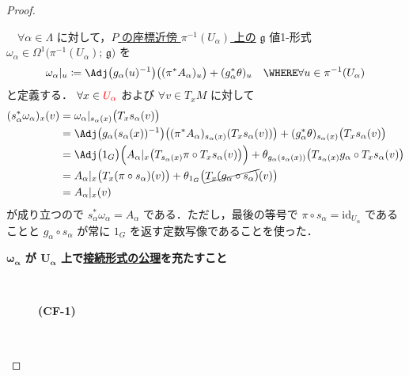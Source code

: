\documentclass[TQFT_main]{subfiles}
\begin{document}
\begin{proof}
\begin{enumerate}
        　$\forall \alpha \in \Lambda$ に対して，\underline{$P$ の座標近傍 $\pi^{-1}(U_\alpha)$ 上の} $\mathfrak{g}$ 値1-形式 $\omega_\alpha \in \Omega^1\bigl(\pi^{-1}(U_\alpha);\, \mathfrak{g}\bigr)$ を
        \begin{align}
            \label{def:patched-connection}
            \omega_\alpha|_u \coloneqq \Adj \bigl( g_\alpha(u)^{-1} \bigr)\bigl((\pi^* A_\alpha)_u\bigr) + (g_\alpha^*\theta)_u \quad \WHERE \forall u \in \pi^{-1}(U_\alpha)
        \end{align}
        と定義する．
        $\forall x \in \textcolor{red}{U_\alpha}$ および $\forall v \in T_{x} M$ に対して
        \begin{align}
            (s_\alpha^* \omega_\alpha)_{x}(v)
            &= \omega_\alpha|_{s_\alpha(x)} \bigl( T_{x} s_\alpha (v) \bigr) \\
            &= \Adj \bigl( g_\alpha(s_\alpha(x))^{-1} \bigr)\bigl((\pi^* A_\alpha)_{s_\alpha(x)}(T_x s_\alpha(v))\bigr) + (g_\alpha^*\theta)_{s_\alpha(x)}\bigl( T_{x} s_\alpha (v) \bigr) \\
            &= \Adj \bigl( 1_G \bigr)\Bigl(A_\alpha|_{x}\bigl(T_{s_\alpha(x)} \pi \circ T_x s_\alpha(v)\bigr)\Bigr) + \theta_{g_\alpha(s_\alpha(x))}\bigl( T_{s_\alpha(x)} g_\alpha \circ T_{x} s_\alpha (v) \bigr) \\
            &= A_\alpha|_{x}\bigl(T_x(\pi \circ s_\alpha)(v)\bigr) + \theta_{1_G}\bigl( \cancel{T_{x} (g_\alpha \circ s_\alpha)} (v) \bigr) \\
            &= A_\alpha|_{x}(v)
        \end{align}
        が成り立つので $s_\alpha^* \omega_\alpha = A_\alpha$ である．ただし，最後の等号で $\pi \circ s_\alpha = \mathrm{id}_{U_\alpha}$ であることと $g_\alpha \circ s_\alpha$ が常に $1_G$ を返す定数写像であることを使った．
        \begin{description}
            \item[\textbf{$\bm{\omega_\alpha}$ が $\bm{U_\alpha}$ 上で\hyperref[def:connection]{接続形式の公理}を充たすこと}]　
            
            \begin{description}
                \item[\textbf{(CF-1)}]　


\end{description}
\end{description}
\end{enumerate}
\end{proof}
\end{document}
